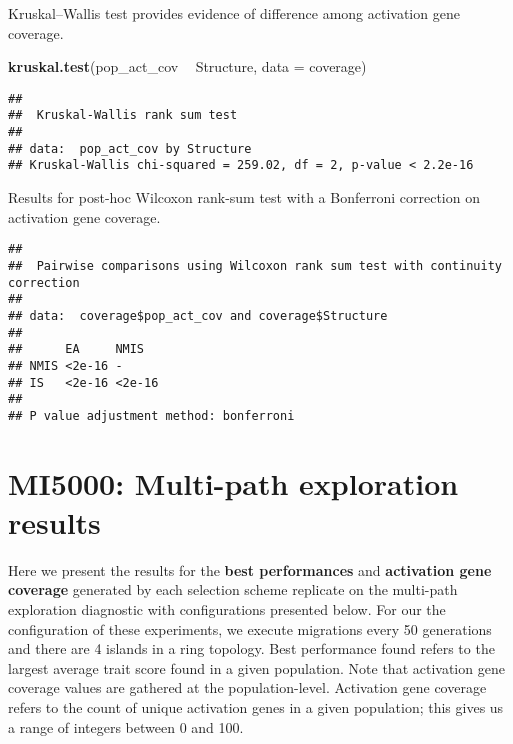 \documentclass[]{book}
\newenvironment{Shaded}{\begin{snugshade}}{\end{snugshade}}
\newcommand{\DataTypeTok}[1]{\textcolor[rgb]{0.13,0.29,0.53}{#1}}
\newcommand{\KeywordTok}[1]{\textcolor[rgb]{0.13,0.29,0.53}{\textbf{#1}}}
\newcommand{\NormalTok}[1]{#1}
\newcommand{\OperatorTok}[1]{\textcolor[rgb]{0.81,0.36,0.00}{\textbf{#1}}}
\newcommand{\OtherTok}[1]{\textcolor[rgb]{0.56,0.35,0.01}{#1}}
\newcommand{\StringTok}[1]{\textcolor[rgb]{0.31,0.60,0.02}{#1}}
\begin{document}
Kruskal--Wallis test provides evidence of difference among activation gene coverage.

\begin{Shaded}
\begin{Highlighting}[]
\KeywordTok{kruskal.test}\NormalTok{(pop_act_cov }\OperatorTok{~}\StringTok{ }\NormalTok{Structure, }\DataTypeTok{data =}\NormalTok{ coverage)}
\end{Highlighting}
\end{Shaded}

\begin{verbatim}
## 
##  Kruskal-Wallis rank sum test
## 
## data:  pop_act_cov by Structure
## Kruskal-Wallis chi-squared = 259.02, df = 2, p-value < 2.2e-16
\end{verbatim}

Results for post-hoc Wilcoxon rank-sum test with a Bonferroni correction on activation gene coverage.

\begin{Shaded}
\end{Shaded}

\begin{verbatim}
## 
##  Pairwise comparisons using Wilcoxon rank sum test with continuity correction 
## 
## data:  coverage$pop_act_cov and coverage$Structure 
## 
##      EA     NMIS  
## NMIS <2e-16 -     
## IS   <2e-16 <2e-16
## 
## P value adjustment method: bonferroni
\end{verbatim}

\hypertarget{mi5000-multi-path-exploration-results}{%
\chapter{MI5000: Multi-path exploration results}\label{mi5000-multi-path-exploration-results}}

Here we present the results for the \textbf{best performances} and \textbf{activation gene coverage} generated by each selection scheme replicate on the multi-path exploration diagnostic with configurations presented below.
For our the configuration of these experiments, we execute migrations every 50 generations and there are 4 islands in a ring topology.
Best performance found refers to the largest average trait score found in a given population.
Note that activation gene coverage values are gathered at the population-level.
Activation gene coverage refers to the count of unique activation genes in a given population; this gives us a range of integers between 0 and 100.
\end{document}
